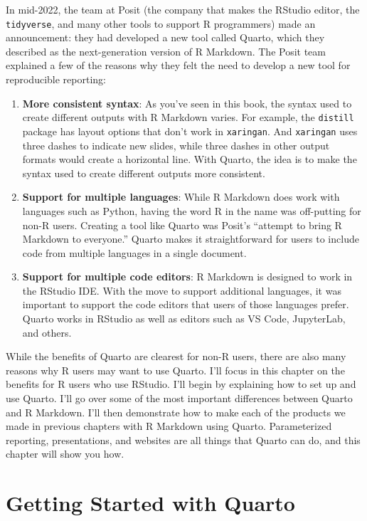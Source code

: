 \documentclass[
]{book}
\providecommand{\tightlist}{%
  \setlength{\itemsep}{0pt}\setlength{\parskip}{0pt}}
\begin{document}
In mid-2022, the team at Posit (the company that makes the RStudio editor, the \texttt{tidyverse}, and many other tools to support R programmers) made an announcement: they had developed a new tool called Quarto, which they described as the next-generation version of R Markdown. The Posit team explained a few of the reasons why they felt the need to develop a new tool for reproducible reporting:

\begin{enumerate}
\def\labelenumi{\arabic{enumi}.}
\tightlist
\item
  \textbf{More consistent syntax}: As you've seen in this book, the syntax used to create different outputs with R Markdown varies. For example, the \texttt{distill} package has layout options that don't work in \texttt{xaringan}. And \texttt{xaringan} uses three dashes to indicate new slides, while three dashes in other output formats would create a horizontal line. With Quarto, the idea is to make the syntax used to create different outputs more consistent.
\item
  \textbf{Support for multiple languages}: While R Markdown does work with languages such as Python, having the word R in the name was off-putting for non-R users. Creating a tool like Quarto was Posit's ``attempt to bring R Markdown to everyone.'' Quarto makes it straightforward for users to include code from multiple languages in a single document.
\item
  \textbf{Support for multiple code editors}: R Markdown is designed to work in the RStudio IDE. With the move to support additional languages, it was important to support the code editors that users of those languages prefer. Quarto works in RStudio as well as editors such as VS Code, JupyterLab, and others.
\end{enumerate}

While the benefits of Quarto are clearest for non-R users, there are also many reasons why R users may want to use Quarto. I'll focus in this chapter on the benefits for R users who use RStudio. I'll begin by explaining how to set up and use Quarto. I'll go over some of the most important differences between Quarto and R Markdown. I'll then demonstrate how to make each of the products we made in previous chapters with R Markdown using Quarto. Parameterized reporting, presentations, and websites are all things that Quarto can do, and this chapter will show you how.

\hypertarget{getting-started-with-quarto}{%
\section*{Getting Started with Quarto}\label{getting-started-with-quarto}}
\end{document}
